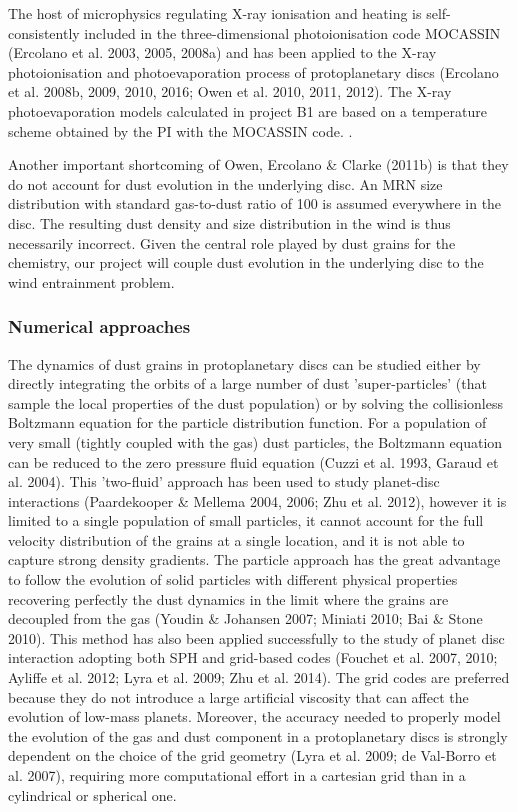 \documentclass[10pt,fleqn,twoside]{article}
\begin{document}
 The host of microphysics regulating
X-ray ionisation and heating is self-consistently included in the
three-dimensional photoionisation code MOCASSIN (Ercolano et al. 2003,
2005, 2008a) and has been applied to the X-ray photoionisation and
photoevaporation process of protoplanetary discs (Ercolano et
al. 2008b, 2009, 2010, 2016; Owen et al. 2010, 2011, 2012). 
The X-ray photoevaporation models calculated in project B1 are based
on a temperature scheme obtained by the PI with the MOCASSIN code. . 

Another important shortcoming of Owen, Ercolano \& Clarke (2011b) is
that they do not account for dust evolution in the underlying disc. An
MRN size distribution with standard gas-to-dust ratio of 100 is
assumed everywhere in the disc. The resulting dust density and size
distribution in the wind is thus necessarily incorrect. Given the
central role played by dust grains for the chemistry, our project will
couple dust evolution in the underlying disc to the wind entrainment
problem. 

\subsubsection{Numerical approaches}

The dynamics of dust grains in protoplanetary discs can be studied either by directly integrating the orbits of a large number of dust 'super-particles' (that sample the local properties of the dust population) or by solving the collisionless Boltzmann equation for the particle distribution function. For a population of very small (tightly coupled with the gas) dust particles, the Boltzmann equation can be reduced to the zero pressure fluid equation (Cuzzi et al. 1993, Garaud et al. 2004). This 'two-fluid' approach has been used to study planet-disc interactions (Paardekooper \& Mellema 2004, 2006; Zhu et al. 2012), however it is limited to a single population of small particles, it cannot account for the full velocity distribution of the grains at a single location, and it is not able to capture strong density gradients. The particle approach has the great advantage to follow the evolution of solid particles with different physical properties recovering perfectly the dust dynamics in the limit where the grains are decoupled from the gas (Youdin \& Johansen 2007; Miniati 2010; Bai \& Stone 2010). This method has also been applied successfully to the study of planet disc interaction adopting both SPH and grid-based codes (Fouchet et al. 2007, 2010; Ayliffe et al. 2012; Lyra et al. 2009; Zhu et al. 2014). The grid codes are preferred because they do not introduce a large artificial viscosity that can affect the evolution of low-mass planets. Moreover, the accuracy needed to properly model the evolution of the gas and dust component in a protoplanetary discs is strongly dependent on the choice of the grid geometry (Lyra et al. 2009; de Val-Borro et al. 2007), requiring more computational effort in a cartesian grid than in a cylindrical or spherical one.
\end{document}

